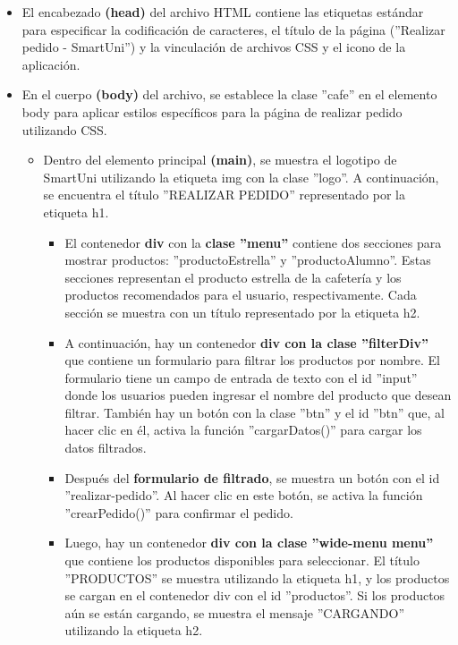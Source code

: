 \documentclass[12pt]{report}
\begin{document}
\begin{itemize}
    \item El encabezado\textbf{ (head) }del archivo HTML contiene las etiquetas estándar para especificar la codificación de caracteres, el título de la página (''Realizar pedido - SmartUni'') y la vinculación de archivos CSS y el icono de la aplicación.

    \item En el cuerpo \textbf{(body)} del archivo, se establece la clase ''cafe'' en el elemento body para aplicar estilos específicos para la página de realizar pedido utilizando CSS.

    \begin{itemize}
        \item Dentro del elemento principal \textbf{(main)}, se muestra el logotipo de SmartUni utilizando la etiqueta img con la clase ''logo''. A continuación, se encuentra el título ''REALIZAR PEDIDO'' representado por la etiqueta h1.
        
        \begin{itemize}
            \item El contenedor \textbf{div} con la \textbf{clase ''menu''} contiene dos secciones para mostrar productos: ''productoEstrella'' y ''productoAlumno''. Estas secciones representan el producto estrella de la cafetería y los productos recomendados para el usuario, respectivamente. Cada sección se muestra con un título representado por la etiqueta h2.
            
            \item A continuación, hay un contenedor \textbf{div con la clase ''filterDiv''} que contiene un formulario para filtrar los productos por nombre. El formulario tiene un campo de entrada de texto con el id ''input'' donde los usuarios pueden ingresar el nombre del producto que desean filtrar. También hay un botón con la clase ''btn'' y el id ''btn'' que, al hacer clic en él, activa la función ''cargarDatos()'' para cargar los datos filtrados.
            
            \item Después del \textbf{formulario de filtrado}, se muestra un botón con el id ''realizar-pedido''. Al hacer clic en este botón, se activa la función ''crearPedido()'' para confirmar el pedido.
            
            \item Luego, hay un contenedor \textbf{div con la clase ''wide-menu menu''} que contiene los productos disponibles para seleccionar. El título ''PRODUCTOS'' se muestra utilizando la etiqueta h1, y los productos se cargan en el contenedor div con el id ''productos''. Si los productos aún se están cargando, se muestra el mensaje ''CARGANDO'' utilizando la etiqueta h2.
        \end{itemize}
    \end{itemize}


\end{itemize}
\end{document}
